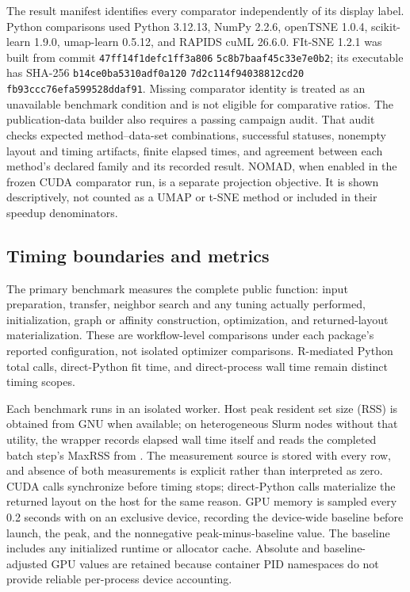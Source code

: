 \documentclass[article]{jss}
\begin{document}
The result manifest identifies every comparator independently of its display
label. Python comparisons used Python 3.12.13, NumPy 2.2.6, openTSNE 1.0.4,
scikit-learn 1.9.0, umap-learn 0.5.12, and RAPIDS cuML 26.6.0. FIt-SNE 1.2.1
was built from commit
\texttt{47ff14f1de}\allowbreak\texttt{fc1ff3a806}\allowbreak
\texttt{5c8b7baaf4}\allowbreak\texttt{5c33e7e0b2}; its executable has SHA-256
\texttt{b14ce0ba53}\allowbreak\texttt{10adf0a120}\allowbreak
\texttt{7d2c114f94}\allowbreak\texttt{038812cd20}\allowbreak
\texttt{fb93ccc76e}\allowbreak\texttt{fa599528dd}\allowbreak\texttt{af91}.
Missing comparator identity is treated as an unavailable benchmark condition
and is not eligible for comparative ratios.
The publication-data builder also requires a passing campaign audit. That
audit checks expected method--data-set combinations, successful statuses,
nonempty layout and timing artifacts, finite elapsed times, and agreement
between each method's declared family and its recorded result.
NOMAD, when enabled in the frozen CUDA comparator run, is a separate
projection objective. It is shown descriptively, not counted as a UMAP
or t-SNE method or included in their speedup denominators.

\subsection{Timing boundaries and metrics}

The primary benchmark measures the complete public function: input
preparation, transfer, neighbor search and any tuning actually performed,
initialization, graph
or affinity construction, optimization, and returned-layout materialization.
These are workflow-level comparisons under each package's reported
configuration, not isolated optimizer comparisons. R-mediated Python total
calls, direct-Python fit time, and direct-process wall time remain distinct
timing scopes.

Each benchmark runs in an isolated worker. Host peak resident set size (RSS)
is obtained from GNU  when available; on heterogeneous Slurm nodes
without that utility, the wrapper records elapsed wall time itself and reads
the completed batch step's MaxRSS from . The measurement source is
stored with every row, and absence of both measurements is explicit rather
than interpreted as zero. CUDA calls synchronize before timing stops;
direct-Python calls materialize the returned layout on the host for the same
reason. GPU memory is sampled every 0.2 seconds with  on an
exclusive device, recording the device-wide baseline before launch, the peak,
and the nonnegative peak-minus-baseline value. The baseline includes any
initialized runtime or allocator cache. Absolute and baseline-adjusted GPU
values are retained because container PID namespaces do not provide reliable
per-process device accounting.
\end{document}
